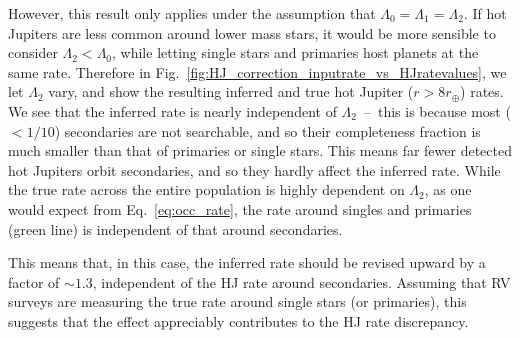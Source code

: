 However, this result only applies under the assumption that $\Lambda_0 = 
\Lambda_1 = \Lambda_2$.
If hot Jupiters are less common around lower mass stars, it would be more 
sensible to consider $\Lambda_2<\Lambda_0$, while letting single stars and 
primaries host planets at the same rate.
Therefore in Fig.~\ref{fig:HJ_correction_inputrate_vs_HJratevalues}, we let 
$\Lambda_2$ vary, and show the resulting inferred and true hot Jupiter 
($r>8r_\oplus$) rates.
We see that the inferred rate is nearly independent of $\Lambda_2$~--~this is 
because most ($<1/10$) secondaries are not searchable, and so their 
completeness fraction is much smaller than that of primaries or single stars.
This means far fewer detected hot Jupiters orbit secondaries, and so they 
hardly affect the inferred rate.
While the true rate across the entire population is highly dependent on 
$\Lambda_2$, as one would expect from Eq.~\ref{eq:occ_rate}, the rate around 
singles and primaries (green line) is independent of that around secondaries.

This means that, in this case, the inferred rate should be revised upward by a 
factor of $\sim1.3$, independent of the HJ rate around secondaries.
Assuming that RV surveys are measuring the true rate around single stars (or 
primaries), this suggests that the effect appreciably contributes to the 
HJ rate discrepancy.